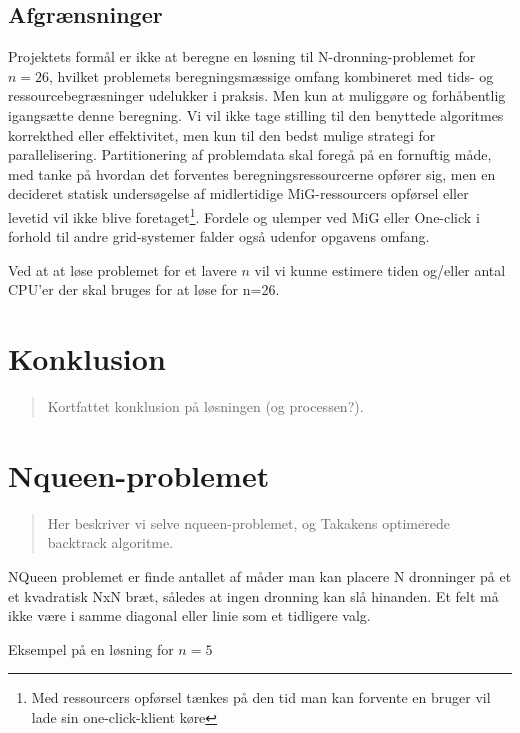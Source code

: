 \documentclass[draft,a4paper,10pt]{article}
\begin{document}
\subsection{Afgrænsninger}\label{afgraensninger}
%

Projektets formål er ikke at beregne en løsning til N-dronning-problemet for $n=26$, hvilket problemets beregningsmæssige omfang kombineret med tids- og ressourcebegræsninger udelukker i praksis. Men kun at muliggøre og forhåbentlig igangsætte denne beregning.
Vi vil ikke tage stilling til den benyttede algoritmes korrekthed eller effektivitet, men kun til den bedst mulige strategi for parallelisering. Partitionering af problemdata skal foregå på en fornuftig måde, med tanke på hvordan det forventes beregningsressourcerne opfører sig, men en decideret statisk undersøgelse af midlertidige MiG-ressourcers opførsel eller levetid vil ikke blive foretaget\footnote{Med ressourcers opførsel tænkes på den tid man kan forvente en bruger vil lade sin one-click-klient køre}. Fordele og ulemper ved MiG eller One-click i forhold til andre grid-systemer falder også udenfor opgavens omfang.

Ved at at løse problemet for et lavere $n$ vil vi kunne estimere tiden og/eller antal CPU'er der skal bruges for at løse for n=26.



\section{Konklusion}\label{konklusion}
\begin{verse}
	Kortfattet konklusion på løsningen (og processen?).
\end{verse}


\section{Nqueen-problemet}\label{nqueenproblemet}
\begin{verse}
	Her beskriver vi selve nqueen-problemet, og Takakens optimerede backtrack algoritme.
\end{verse}


NQueen problemet er finde antallet af måder man kan placere N dronninger på et et kvadratisk NxN bræt, således at ingen dronning kan slå hinanden. Et felt må ikke være i samme diagonal eller linie som et tidligere valg.

Eksempel på en løsning for $n=5$
\end{document}
